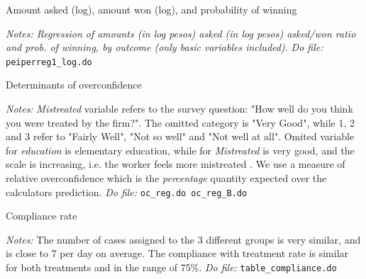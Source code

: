 \documentclass[11pt]{article}
\begin{document}
\begin{table}[H]
    \caption{Amount asked (log), amount won (log), and probability of winning }
    \label{Table_Reg_winnings_log}
    \begin{center}
        \scriptsize{}
    \end{center}
    \footnotesize
    \textit{Notes: Regression of amounts (in log pesos) asked (in log pesos) asked/won ratio and prob. of winning, by outcome (only basic variables included).} 
    \textit{Do file: } \texttt{peiperreg1\_log.do}
\end{table}







\begin{landscape}
\begin{table}[H]
\caption{Determinants of overconfidence}
\label{Table_determinantsOC}
\begin{center}
\scriptsize{}
\end{center}
 \footnotesize
\textit{Notes:} 
\emph{Mistreated} variable refers to the survey question: "How well do you think you were treated by the firm?". The omitted category is "Very Good", while 1, 2 and 3 refer to "Fairly Well", "Not so well" and "Not well at all".
Omited variable for \emph{education} is elementary education, while for \emph{Mistreated} is very good, and the scale is increasing, i.e. the worker feels more mistreated . We use a measure of relative overconfidence which is the \textit{percentage} quantity expected over the calculators prediction.
\textit{Do file: } \texttt{oc\_reg.do oc\_reg\_B.do}
\end{table}

\end{landscape}


\begin{table}[H]
\caption{Compliance rate}
\label{Table_compliance}
\begin{center}
\scriptsize{}
\end{center}
 \footnotesize
\textit{Notes:} 
The number of cases assigned to the 3 different groups is very similar, and is close to 7 per day on average. The compliance with treatment rate is similar for both treatments and in the range of 75\%.
\textit{Do file: } \texttt{table\_compliance.do}
\end{table}
\end{document}

